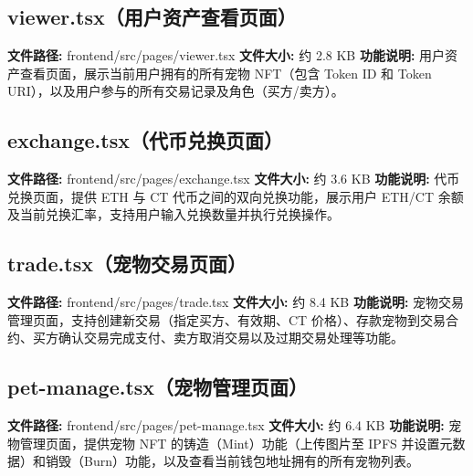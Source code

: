 \documentclass[code]{mancls}
\begin{document}
\pagebreak

\subsection{viewer.tsx（用户资产查看页面）}
\textbf{文件路径:} frontend/src/pages/viewer.tsx
\textbf{文件大小:} 约 2.8 KB
\textbf{功能说明:} 用户资产查看页面，展示当前用户拥有的所有宠物 NFT（包含 Token ID 和 Token URI），以及用户参与的所有交易记录及角色（买方/卖方）。



\pagebreak

\subsection{exchange.tsx（代币兑换页面）}
\textbf{文件路径:} frontend/src/pages/exchange.tsx
\textbf{文件大小:} 约 3.6 KB
\textbf{功能说明:} 代币兑换页面，提供 ETH 与 CT 代币之间的双向兑换功能，展示用户 ETH/CT 余额及当前兑换汇率，支持用户输入兑换数量并执行兑换操作。



\pagebreak

\subsection{trade.tsx（宠物交易页面）}
\textbf{文件路径:} frontend/src/pages/trade.tsx
\textbf{文件大小:} 约 8.4 KB
\textbf{功能说明:} 宠物交易管理页面，支持创建新交易（指定买方、有效期、CT 价格）、存款宠物到交易合约、买方确认交易完成支付、卖方取消交易以及过期交易处理等功能。



\pagebreak

\subsection{pet-manage.tsx（宠物管理页面）}
\textbf{文件路径:} frontend/src/pages/pet-manage.tsx
\textbf{文件大小:} 约 6.4 KB
\textbf{功能说明:} 宠物管理页面，提供宠物 NFT 的铸造（Mint）功能（上传图片至 IPFS 并设置元数据）和销毁（Burn）功能，以及查看当前钱包地址拥有的所有宠物列表。


\end{document}
